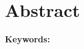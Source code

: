 \documentclass[class=NCU_thesis, crop=false]{standalone}
\begin{document}
\chapter{Abstract}


\vspace{2em}
\noindent \textbf{Keywords:} \keywordsEn{} %
\end{document}
